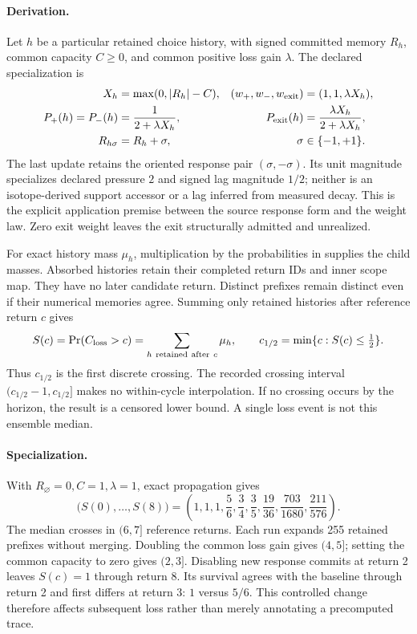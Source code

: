 \paragraph{Derivation.}
Let \(h\) be a particular retained choice history, with signed committed memory \(R_h\),
common capacity \(C\ge0\), and common positive loss gain \(\lambda\). The declared
specialization is
\begin{align}
X_h&=\max(0,|R_h|-C),&
(w_+,w_-,w_{\rm exit})&=(1,1,\lambda X_h),\\
P_+(h)=P_-(h)&=\frac{1}{2+\lambda X_h},&
P_{\rm exit}(h)&=\frac{\lambda X_h}{2+\lambda X_h},\label{eq:manual2-survival-kernel}\\
R_{h\sigma}&=R_h+\sigma,&\sigma&\in\{-1,+1\}.
\end{align}
The last update retains the oriented response pair \((\sigma,-\sigma)\). Its unit
magnitude specializes declared pressure \(2\) and signed lag magnitude \(1/2\);
neither is an isotope-derived support accessor or a lag inferred from measured decay.
This is the explicit application premise between the source response form and the
weight law. Zero exit weight leaves the exit structurally admitted and unrealized.

For exact history mass \(\mu_h\), multiplication by the probabilities in
 supplies the child masses. Absorbed histories retain
their completed return IDs and inner scope map. They have no later candidate return.
Distinct prefixes remain distinct even if their numerical memories agree. Summing only
retained histories after reference return \(c\) gives
\begin{equation}
S(c)=\Pr(C_{\rm loss}>c)=\sum_{h\ \mathrm{retained\ after}\ c}\mu_h,
\qquad
c_{1/2}=\min\{c:S(c)\le\tfrac12\}.
\label{eq:manual2-survival-median}
\end{equation}
Thus \(c_{1/2}\) is the first discrete crossing. The recorded crossing interval
\((c_{1/2}-1,c_{1/2}]\) makes no within-cycle interpolation. If no crossing occurs by
the horizon, the result is a censored lower bound. A single loss event is not this
ensemble median.

\paragraph{Specialization.}
With \(R_\varnothing=0,C=1,\lambda=1\), exact propagation gives
\begin{equation}
\bigl(S(0),\ldots,S(8)\bigr)=
\left(1,1,1,\frac56,\frac34,\frac35,\frac{19}{36},
\frac{703}{1680},\frac{211}{576}\right).
\label{eq:manual2-survival-results}
\end{equation}
The median crosses in \((6,7]\) reference returns. Each run expands 255 retained
prefixes without merging. Doubling the common loss gain gives \((4,5]\); setting
the common capacity to zero gives \((2,3]\). Disabling new response commits at return
2 leaves \(S(c)=1\) through return 8. Its survival agrees with the baseline through
return 2 and first differs at return 3: \(1\) versus \(5/6\). This controlled change
therefore affects subsequent loss rather than merely annotating a precomputed trace.

